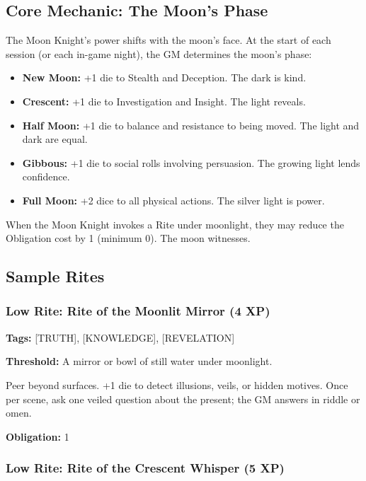 \subsection{Core Mechanic: The Moon's Phase}

The Moon Knight's power shifts with the moon's face. At the start of each session (or each in-game night), the GM determines the moon's phase:

\begin{itemize}
\item \textbf{New Moon:} +1 die to Stealth and Deception. The dark is kind.
\item \textbf{Crescent:} +1 die to Investigation and Insight. The light reveals.
\item \textbf{Half Moon:} +1 die to balance and resistance to being moved. The light and dark are equal.
\item \textbf{Gibbous:} +1 die to social rolls involving persuasion. The growing light lends confidence.
\item \textbf{Full Moon:} +2 dice to all physical actions. The silver light is power.
\end{itemize}

When the Moon Knight invokes a Rite under moonlight, they may reduce the Obligation cost by 1 (minimum 0). The moon witnesses.

\subsection{Sample Rites}

\subsubsection{Low Rite: Rite of the Moonlit Mirror (4 XP)}

\textbf{Tags:} [TRUTH], [KNOWLEDGE], [REVELATION]

\textbf{Threshold:} A mirror or bowl of still water under moonlight.

Peer beyond surfaces. +1 die to detect illusions, veils, or hidden motives. Once per scene, ask one veiled question about the present; the GM answers in riddle or omen.

\textbf{Obligation:} 1

\subsubsection{Low Rite: Rite of the Crescent Whisper (5 XP)}

